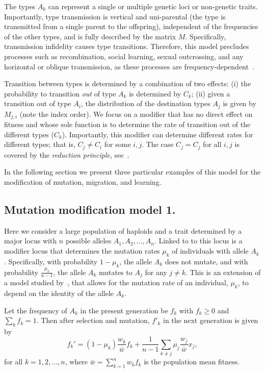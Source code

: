 \documentclass[9pt, a4paper, twocolumn]{extarticle}   	%
\begin{document}
The types $A_k$ can represent a single or multiple genetic loci or non-genetic traits.
Importantly, type transmission is vertical and uni-parental (the type is transmitted from a single parent to the offspring), independent of the frequencies of the other types, and is fully described by the matrix $M$. Specifically, transmission infidelity causes type transitions.
Therefore, this model precludes processes such as recombination, social learning, sexual outcrossing, and any horizontal or oblique transmission, as these processes are frequency-dependent~\cite[pg.~54]{Cavalli-Sforza1981}.

Transition between types is determined by a combination of two effects:
(i) the probability to transition \emph{out} of type $A_k$ is determined by $C_k$;
(ii) given a transition out of type $A_i$, the distribution of the destination types $A_j$ is given by $M_{j,i}$ (note the index order).
We focus on a modifier that has no direct effect on fitness and whose sole function is to determine the rate of transition out of the different types ($C_k$).
Importantly, this modifier can determine different rates for different types; that is, $C_j \ne C_i$ for some $i,j$. The case $C_j = C_j$ for all $i,j$ is covered by the \emph{reduction principle}, see~\citet{Altenberg2017}.

In the following section we present three particular examples of this model for the modification of mutation, migration, and learning.

\subsection*{Mutation modification model 1.}

Here we consider a large population of haploids and a trait determined by a major locus with $n$ possible alleles $A_1, A_2, ..., A_n$.
Linked to to this locus is a modifier locus that determines the mutation rates $\mu_k$ of individuals with allele $A_k$.
Specifically, with probability $1-\mu_k$, the allele $A_k$ does not mutate, and with probability $\frac{\mu_k}{n-1}$, the allele $A_k$ mutates to $A_j$ for any $j \ne k$.
This is an extension of a model studied by~\citet{Altenberg2017}, that allows for the mutation rate of an individual, $\mu_k$, to depend on the identity of the allele $A_k$.

Let the frequency of $A_k$ in the present generation be $f_k$ with $f_k \ge 0$ and $\sum_k{f_k}=1$.
Then after selection and mutation, $f'_k$ in the next generation is given by
\begin{equation}
f_k' = (1 - \mu_k) \frac{w_k}{\bar{w}} f_k + \frac{1}{n-1} \sum_{k \ne j}{\mu_j \frac{w_j}{\bar{w}} x_j},
\label{eq:mutation_model_1}
\end{equation}
for all $k=1,2,\ldots,n$, where $\bar{w} = \sum_{k=1}^{n}{w_k f_k}$ is the population mean fitness.
\end{document}
